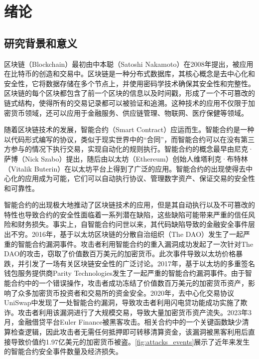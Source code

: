 \chapter{绪论}


\section{研究背景和意义}
\label{sec:研究背景和意义}

区块链（Blockchain）最初由中本聪（Satoshi Nakamoto）在2008年提出\cite{nakamoto2008bitcoin}，被应用在比特币的创造和交易中。区块链是一种分布式数据库，其核心概念是去中心化和安全性，它将数据存储在多个节点上，并使用密码学技术确保其安全性和完整性。区块链的每个区块都包含了前一个区块的信息以及时间戳，形成了一个不可篡改的链式结构，使得所有的交易记录都可以被验证和追溯。这种技术的应用不仅限于加密货币领域，还可以应用于金融服务、供应链管理、物联网、医疗保健等领域。

随着区块链技术的发展，智能合约（Smart Contract）应运而生。智能合约是一种以代码形式编写的协议，类似于现实世界中的“合同”，而智能合约可以在没有第三方参与的情况下执行交易，实现自动化的规则执行。智能合约的概念最早由尼克·萨博（Nick Szabo）提出，随后由以太坊（Ethereum）创始人维塔利克·布特林（Vitalik Buterin）在以太坊平台上得到了广泛的应用。智能合约的出现使得去中心化的应用成为可能，它们可以自动执行协议、管理数字资产、保证交易的安全性和可靠性。

智能合约的出现极大地推动了区块链技术的应用，但是其自动执行以及不可篡改的特性也导致合约的安全性面临着一系列潜在缺陷，这些缺陷可能带来严重的信任风险和财务损失。事实上，自智能合约问世以来，其代码缺陷导致的金融安全事件层出不穷。2016年，基于以太坊区块链的分散自治组织（The DAO）发生了一起严重的智能合约漏洞事件。攻击者利用智能合约的重入漏洞成功发起了一次针对The DAO的攻击，窃取了价值数百万美元的加密货币。此次事件导致以太坊价格暴跌，并引发了一场有关区块链安全性的广泛讨论。2017年，基于以太坊的多重签名钱包服务提供商Parity Technologies发生了一起严重的智能合约漏洞事件。由于智能合约中的一个错误操作，攻击者成功冻结了价值数百万美元的加密货币资产，影响了众多加密货币投资者和交易所的资金安全\cite{niyuandong}。2020年，去中心化交易协议UniSwap中发现了一处智能合约漏洞，导致攻击者利用闪电贷功能成功实施了欺诈。攻击者利用该漏洞进行了大规模交易，导致大量加密货币资产流失。2023年3月，金融借贷平台Euler Finance被黑客攻击。相关合约中的一个关键函数缺少清算检查逻辑，因此攻击者无需任何抵押即可转移清算资金，该漏洞被黑客利用后直接导致价值约1.97亿美元的加密货币被盗。\autoref{fig:attacks_events}展示了近年来发生的智能合约安全事件数量及经济损失。

